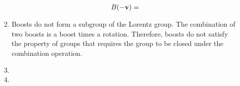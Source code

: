 \documentclass[12pt,a4]{article}
\begin{document}
\begin{enumerate}
\begin{enumerate}
        \begin{align*}
          B(-{\bf v}) = 
        \end{align*}
      \item
        Boosts do not form a subgroup of the Lorentz group.
        The combination of two boosts is a boost times a rotation.
        Therefore, boosts do not satisfy the property of groups that requires the group to be closed under the combination operation.
      \item
      \item
    \end{enumerate}
\end{enumerate}
\end{document}
